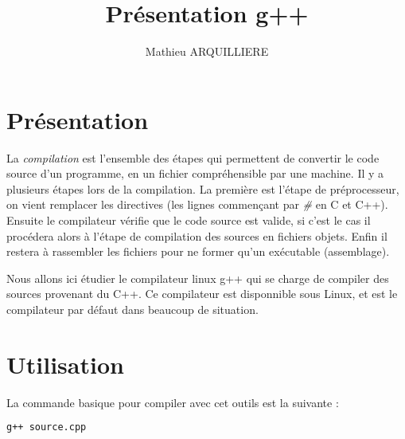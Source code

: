 \documentclass[a4paper, 12pt]{article}
\title{Présentation g++}
\author{Mathieu ARQUILLIERE}
\begin{document}
\maketitle
\pagebreak
\tableofcontents
\pagebreak
\section{Présentation}
    La \emph{compilation} est l'ensemble des étapes qui permettent de convertir le code source d'un programme, en un fichier compréhensible par une machine.
    Il y a plusieurs étapes lors de la compilation. La première est l'étape de préprocesseur, on vient remplacer les directives (les lignes commençant par \emph{\#} en C et C++).
    Ensuite le compilateur vérifie que le code source est valide, si c'est le cas il procédera alors à l'étape de compilation des sources en fichiers objets. Enfin il restera à rassembler les fichiers pour ne former qu'un exécutable (assemblage).

    Nous allons ici étudier le compilateur linux g++ qui se charge de compiler des sources provenant du C++.
    Ce compilateur est disponnible sous Linux, et est le compilateur par défaut dans beaucoup de situation.

\section{Utilisation}
    La commande basique pour compiler avec cet outils est la suivante :
    \begin{mdframed}[backgroundcolor=light-gray, roundcorner=20pt,
        innerleftmargin=20, innertopmargin=1, innerbottommargin=1, 
        outerlinewidth=1, linecolor=darkgray]
        \begin{lstlisting}[language=Bash]
g++ source.cpp
        \end{lstlisting}
    \end{mdframed} 
\end{document}
